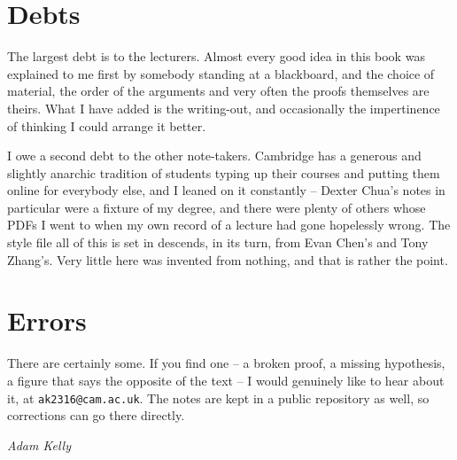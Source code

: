 \section*{Debts}

The largest debt is to the lecturers. Almost every good idea in this book was explained
to me first by somebody standing at a blackboard, and the choice of material, the order
of the arguments and very often the proofs themselves are theirs. What I have added is
the writing-out, and occasionally the impertinence of thinking I could arrange it
better.

I owe a second debt to the other note-takers. Cambridge has a generous and slightly
anarchic tradition of students typing up their courses and putting them online for
everybody else, and I leaned on it constantly -- Dexter Chua's notes in particular were
a fixture of my degree, and there were plenty of others whose PDFs I went to when my
own record of a lecture had gone hopelessly wrong. The style file all of this is set in
descends, in its turn, from Evan Chen's and Tony Zhang's. Very little here was invented
from nothing, and that is rather the point.

\section*{Errors}

There are certainly some. If you find one -- a broken proof, a missing hypothesis, a
figure that says the opposite of the text -- I would genuinely like to hear about it,
at \texttt{ak2316@cam.ac.uk}. The notes are kept in a public repository as well, so
corrections can go there directly.

\bigskip
\noindent\emph{Adam Kelly}
